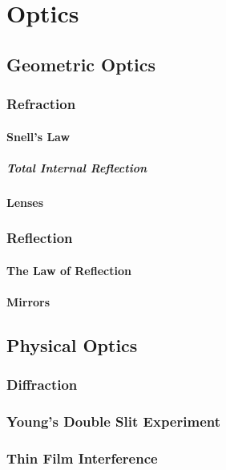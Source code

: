 \chapter{Optics}
	\section{Geometric Optics}
	\subsection{Refraction}
		\subsubsection{Snell's Law}
					\paragraph{Total Internal Reflection}
		\subsubsection{Lenses}

	\subsection{Reflection}
		\subsubsection{The Law of Reflection}
		\subsubsection{Mirrors}
		
	\section{Physical Optics}
		\subsection{Diffraction}
		\subsection{Young's Double Slit Experiment}
		\subsection{Thin Film Interference}
		
		
		
	

	


